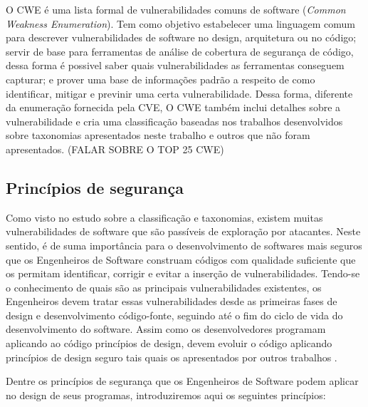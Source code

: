 %
O CWE é uma lista formal de vulnerabilidades comuns de software (\emph{Common Weakness Enumeration}). Tem como objetivo estabelecer uma linguagem comum para descrever vulnerabilidades de software no design, arquitetura ou no código; servir de base para ferramentas de análise de cobertura de segurança de código, dessa forma é possivel saber quais vulnerabilidades as ferramentas conseguem capturar; e prover uma base de informações padrão a respeito de como identificar, mitigar e previnir uma certa vulnerabilidade. Dessa forma, diferente da enumeração fornecida pela CVE, O CWE também inclui detalhes sobre a vulnerabilidade e cria uma classificação baseadas nos trabalhos desenvolvidos sobre taxonomias apresentados neste trabalho e outros que não foram apresentados.
(FALAR SOBRE O TOP 25 CWE)
%

\subsection{Princípios de segurança}

Como visto no estudo sobre a classificação e taxonomias, existem muitas vulnerabilidades de software que são passíveis de exploração por atacantes. Neste sentido, é de suma importância para o desenvolvimento de softwares mais seguros que os Engenheiros de Software construam códigos com qualidade suficiente que os permitam identificar, corrigir e evitar a inserção de vulnerabilidades. Tendo-se o conhecimento de quais são as principais vulnerabilidades existentes, os Engenheiros devem tratar essas vulnerabilidades desde as primeiras fases de design e desenvolvimento código-fonte, seguindo até o fim do ciclo de vida do desenvolvimento do software. Assim como os desenvolvedores programam aplicando ao código princípios de design, devem evoluir o código aplicando princípios de design seguro tais quais os apresentados por outros trabalhos \cite{saltzer1975} \cite{bishop2003} \cite{mcgraw2002} \cite{a1lshammari2009}.

%

Dentre os princípios de segurança que os Engenheiros de Software podem aplicar no design de seus programas, introduziremos aqui os seguintes princípios:

